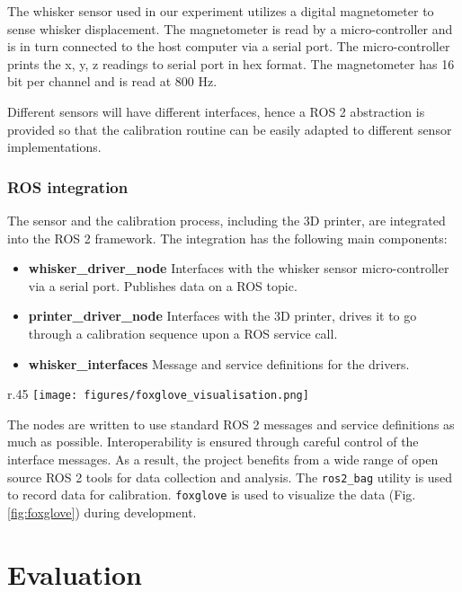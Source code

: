 \documentclass[runningheads]{llncs}
\begin{document}
The whisker sensor used in our experiment utilizes a digital magnetometer to sense whisker displacement. The magnetometer is read by a micro-controller and is in turn connected to the host computer via a serial port. The micro-controller prints the x, y, z readings to serial port in hex format. The magnetometer has 16 bit per channel and is read at 800 Hz.

Different sensors will have different interfaces, hence a ROS 2 abstraction is provided so that the calibration routine can be easily adapted to different sensor implementations.

\subsubsection{ROS integration}

The sensor and the calibration process, including the 3D printer, are integrated into the ROS 2 framework. The integration has the following main components:

\begin{itemize}
    \item \textbf{whisker\_driver\_node} Interfaces with the whisker sensor micro-controller via a serial port. Publishes data on a ROS topic.
    \item \textbf{printer\_driver\_node} Interfaces with the 3D printer, drives it to go through a calibration sequence upon a ROS service call.
    \item \textbf{whisker\_interfaces} Message and service definitions for the drivers.
\end{itemize}

\begin{wrapfigure}{r}{.45\textwidth}
    \centering
    \texttt{[image: figures/foxglove\_visualisation.png]}
    \caption{Foxglove visualization of whisker sensor system running in ROS 2}
    \label{fig:foxglove}
\end{wrapfigure}

The nodes are written to use standard ROS 2 messages and service definitions as much as possible. Interoperability is ensured through careful control of the interface messages. As a result, the project benefits from a wide range of open source ROS 2 tools for data collection and analysis. The \verb|ros2_bag| utility is used to record data for calibration. \verb|foxglove| is used to visualize the data (Fig. \ref{fig:foxglove}) during development.

\section{Evaluation}
\end{document}
